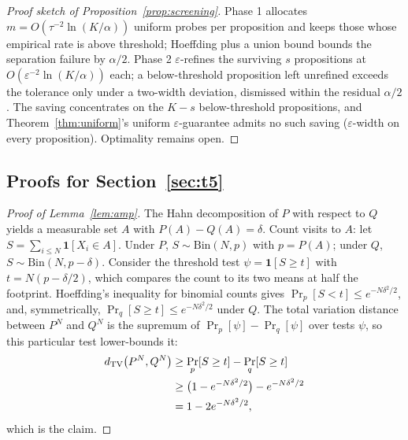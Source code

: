 \begin{proof}[Proof sketch of Proposition~\ref{prop:screening}]
Phase 1 allocates $m=O(\tau^{-2}\ln(K/\alpha))$ uniform probes per
proposition and keeps those whose empirical rate is above threshold;
Hoeffding plus a union bound bounds the separation failure by $\alpha/2$.
Phase 2 $\varepsilon$-refines the surviving $s$ propositions at
$O(\varepsilon^{-2}\ln(K/\alpha))$ each; a below-threshold proposition left
unrefined exceeds the tolerance only under a two-width deviation, dismissed
within the residual $\alpha/2$. The saving concentrates on the $K-s$
below-threshold propositions, and Theorem~\ref{thm:uniform}'s uniform
$\varepsilon$-guarantee admits no such saving ($\varepsilon$-width on every
proposition). Optimality remains open.
\end{proof}

\subsection{Proofs for Section~\ref{sec:t5}}\label{app:t5}

\begin{proof}[Proof of Lemma~\ref{lem:amp}]
The Hahn decomposition of $P$ with respect to $Q$ yields a measurable set $A$
with $P(A)-Q(A)=\delta$. Count visits to $A$: let
$S=\sum_{i\le N}\mathbf{1}[X_i\in A]$. Under $P$,
$S\sim\mathrm{Bin}(N,p)$ with $p=P(A)$; under $Q$,
$S\sim\mathrm{Bin}(N,p-\delta)$. Consider the threshold test
$\psi=\mathbf{1}[S\ge t]$ with $t=N(p-\delta/2)$, which compares the count to
its two means at half the footprint. Hoeffding's inequality for binomial
counts gives $\Pr_p[S<t]\le e^{-N\delta^{2}/2}$, and, symmetrically,
$\Pr_q[S\ge t]\le e^{-N\delta^{2}/2}$ under $Q$.
The total variation distance between $P^{N}$ and $Q^{N}$ is the supremum of
$\Pr_p[\psi]-\Pr_q[\psi]$ over tests $\psi$, so this particular test lower-bounds it:
\[
\begin{aligned}
d_{\mathrm{TV}}\bigl(P^{N},Q^{N}\bigr)
&\ge\Pr_p[S\ge t]-\Pr_q[S\ge t]\\
&\ge\bigl(1-e^{-N\delta^{2}/2}\bigr)-e^{-N\delta^{2}/2}\\
&=1-2e^{-N\delta^{2}/2},
\end{aligned}
\]
which is the claim.
\end{proof}

